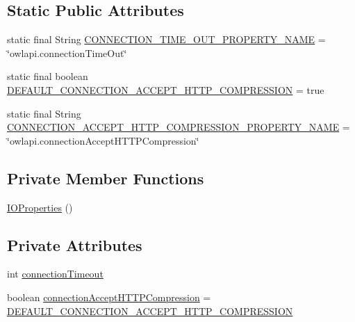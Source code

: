\subsection*{Static Public Attributes}
\begin{DoxyCompactItemize}
\item 
static final String \hyperlink{classorg_1_1semanticweb_1_1owlapi_1_1io_1_1_i_o_properties_aed3370b7c23cf4b5f93d2a2726862351}{C\-O\-N\-N\-E\-C\-T\-I\-O\-N\-\_\-\-T\-I\-M\-E\-\_\-\-O\-U\-T\-\_\-\-P\-R\-O\-P\-E\-R\-T\-Y\-\_\-\-N\-A\-M\-E} = \char`\"{}owlapi.\-connection\-Time\-Out\char`\"{}
\item 
static final boolean \hyperlink{classorg_1_1semanticweb_1_1owlapi_1_1io_1_1_i_o_properties_a8f79eede2c8c1709db3c5b9a75f9bf1a}{D\-E\-F\-A\-U\-L\-T\-\_\-\-C\-O\-N\-N\-E\-C\-T\-I\-O\-N\-\_\-\-A\-C\-C\-E\-P\-T\-\_\-\-H\-T\-T\-P\-\_\-\-C\-O\-M\-P\-R\-E\-S\-S\-I\-O\-N} = true
\item 
static final String \hyperlink{classorg_1_1semanticweb_1_1owlapi_1_1io_1_1_i_o_properties_a164fd845842df52b1ae377d50642cd5a}{C\-O\-N\-N\-E\-C\-T\-I\-O\-N\-\_\-\-A\-C\-C\-E\-P\-T\-\_\-\-H\-T\-T\-P\-\_\-\-C\-O\-M\-P\-R\-E\-S\-S\-I\-O\-N\-\_\-\-P\-R\-O\-P\-E\-R\-T\-Y\-\_\-\-N\-A\-M\-E} = \char`\"{}owlapi.\-connection\-Accept\-H\-T\-T\-P\-Compression\char`\"{}
\end{DoxyCompactItemize}
\subsection*{Private Member Functions}
\begin{DoxyCompactItemize}
\item 
\hyperlink{classorg_1_1semanticweb_1_1owlapi_1_1io_1_1_i_o_properties_ad54a3f41b877fb546ba2014c023671c1}{I\-O\-Properties} ()
\end{DoxyCompactItemize}
\subsection*{Private Attributes}
\begin{DoxyCompactItemize}
\item 
int \hyperlink{classorg_1_1semanticweb_1_1owlapi_1_1io_1_1_i_o_properties_af2097004dc3dc16597aa4f232de86e06}{connection\-Timeout}
\item 
boolean \hyperlink{classorg_1_1semanticweb_1_1owlapi_1_1io_1_1_i_o_properties_a3182d8cba137da367771eeb4461dd3db}{connection\-Accept\-H\-T\-T\-P\-Compression} = \hyperlink{classorg_1_1semanticweb_1_1owlapi_1_1io_1_1_i_o_properties_a8f79eede2c8c1709db3c5b9a75f9bf1a}{D\-E\-F\-A\-U\-L\-T\-\_\-\-C\-O\-N\-N\-E\-C\-T\-I\-O\-N\-\_\-\-A\-C\-C\-E\-P\-T\-\_\-\-H\-T\-T\-P\-\_\-\-C\-O\-M\-P\-R\-E\-S\-S\-I\-O\-N}
\end{DoxyCompactItemize}
